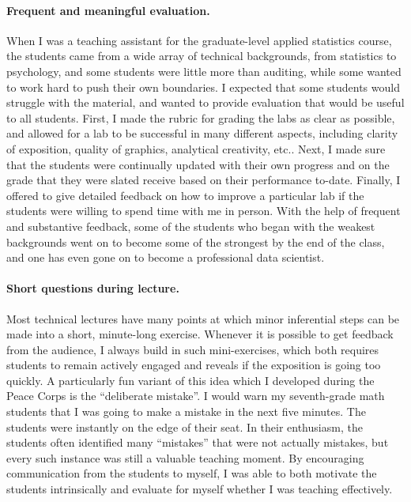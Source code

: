 \paragraph{Frequent and meaningful evaluation.}

When I was a teaching assistant for the graduate-level applied statistics
course, the students came from a wide array of technical backgrounds, from
statistics to psychology, and some students were little more than auditing,
while some wanted to work hard to push their own boundaries.  I expected that
some students would struggle with the material, and wanted to provide evaluation
that would be useful to all students.  First, I made the rubric for grading the
labs as clear as possible, and allowed for a lab to be successful in many
different aspects, including clarity of exposition, quality of graphics,
analytical creativity, etc..  Next, I made sure that the students were
continually updated with their own progress and on the grade that they were
slated receive based on their performance to-date.  Finally, I offered to give
detailed feedback on how to improve a particular lab if the students were
willing to spend time with me in person.  With the help of frequent and
substantive feedback, some of the students who began with the weakest
backgrounds went on to become some of the strongest by the end of the class, and
one has even gone on to become a professional data scientist.


\paragraph{Short questions during lecture.}

Most technical lectures have many points at which minor inferential steps can be
made into a short, minute-long exercise.  Whenever it is possible to get
feedback from the audience, I always build in such mini-exercises, which both
requires students to remain actively engaged and reveals if the exposition is
going too quickly.  A particularly fun variant of this idea which I developed
during the Peace Corps is the ``deliberate mistake''.  I would warn my
seventh-grade math students that I was going to make a mistake in the next five
minutes. The students were instantly on the edge of their seat.  In their
enthusiasm, the students often identified many ``mistakes'' that were not
actually mistakes, but every such instance  was still a valuable teaching
moment.  By encouraging communication from the students to myself, I was able to
both motivate the students intrinsically and evaluate for myself whether I was
teaching effectively.



